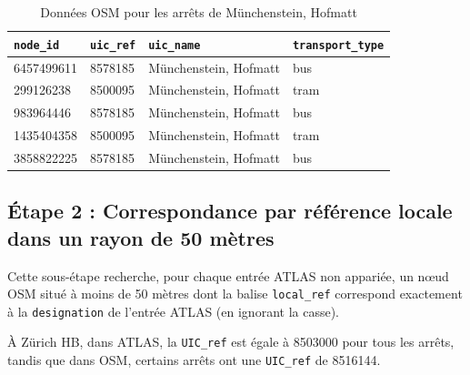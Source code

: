 \begin{table}[h]
\caption[Données OSM – Münchenstein, Hofmatt]{Données OSM pour les arrêts de Münchenstein, Hofmatt}
\label{tab:osm_data}
\centering
\begin{tabular}{l l l l}
\toprule
\texttt{node\_id} & \texttt{uic\_ref} & \texttt{uic\_name} & \texttt{transport\_type} \\
\midrule
6457499611 & 8578185 & Münchenstein, Hofmatt & bus \\
299126238 & 8500095 & Münchenstein, Hofmatt & tram \\
983964446 & 8578185 & Münchenstein, Hofmatt & bus \\
1435404358 & 8500095 & Münchenstein, Hofmatt & tram \\
3858822225 & 8578185 & Münchenstein, Hofmatt & bus \\
\bottomrule
\end{tabular}
\end{table}

\FloatBarrier

\subsection{Étape 2 : Correspondance par référence locale dans un rayon de 50 mètres}
Cette sous-étape recherche, pour chaque entrée ATLAS non appariée, un nœud OSM situé à moins de 50 mètres dont la balise \texttt{local\_ref} correspond exactement à la \texttt{designation} de l’entrée ATLAS (en ignorant la casse).

À Zürich HB, dans ATLAS, la \texttt{UIC\_ref} est égale à 8503000 pour tous les arrêts, tandis que dans OSM, certains arrêts ont une \texttt{UIC\_ref} de 8516144. 

